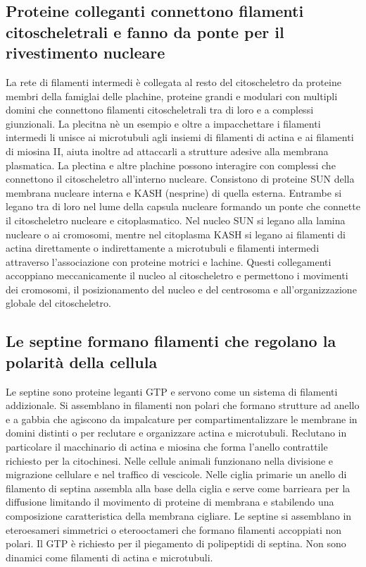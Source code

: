 \subsection{Proteine colleganti connettono filamenti citoscheletrali e fanno da ponte per il rivestimento nucleare}
La rete di filamenti intermedi \`e collegata al resto del citoscheletro da proteine membri della famiglai delle plachine, proteine grandi e modulari con multipli domini che connettono
filamenti citoscheletrali tra di loro e a complessi giunzionali. La plecitna n\`e un esempio e oltre a impacchettare i filamenti intermedi li unisce ai microtubuli agli insiemi di
filamenti di actina e ai filamenti di miosina II, aiuta inoltre ad attaccarli a strutture adesive alla membrana plasmatica. La plectina e altre plachine possono interagire con complessi
che connettono il citoscheletro all'interno nucleare. Consistono di proteine SUN della membrana nucleare interna e KASH (nesprine) di quella esterna. Entrambe si legano tra di loro nel
lume della capsula nucleare formando un ponte che connette il citoscheletro nucleare e citoplasmatico. Nel nucleo SUN si legano alla lamina nucleare o ai cromosomi, mentre nel citoplasma
KASH si legano ai filamenti di actina direttamente o indirettamente a microtubuli e filamenti intermedi attraverso l'associazione con proteine motrici e lachine. Questi collegamenti
accoppiano meccanicamente il nucleo al citoscheletro e permettono i movimenti dei cromosomi, il posizionamento del nucleo e del centrosoma e all'organizzazione globale del citoscheletro.
\subsection{Le septine formano filamenti che regolano la polarit\`a della cellula}
Le septine sono proteine leganti GTP e servono come un sistema di filamenti addizionale. Si assemblano in filamenti non polari che formano strutture ad anello e a gabbia che agiscono 
da impalcature per compartimentalizzare le membrane in domini distinti o per reclutare e organizzare actina e microtubuli. Reclutano in particolare il macchinario di actina e miosina 
che forma l'anello contrattile richiesto per la citochinesi. Nelle cellule animali funzionano nella divisione e migrazione cellulare e nel traffico di vescicole. Nelle ciglia primarie
un anello di filamento di septina assembla alla base della ciglia e serve come barrieara per la diffusione limitando il movimento di proteine di membrana e stabilendo una composizione
caratteristica della membrana cigliare. Le septine si assemblano in eteroesameri simmetrici o eterooctameri che formano filamenti accoppiati non polari. Il GTP \`e richiesto per il 
piegamento di polipeptidi di septina. Non sono dinamici come filamenti di actina e microtubuli. 
